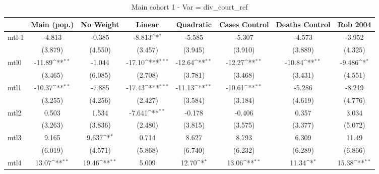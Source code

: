 \documentclass{article}
\begin{document}
{
\def\sym#1{\ifmmode^{#1}\else\(^{#1}\)\fi}
\begin{longtable}{l*{7}{c}}
\caption{Main cohort 1 - Var = div\_court\_ref}\\
\hline\hline\endfirsthead\hline\endhead\hline\endfoot\endlastfoot
                &\multicolumn{1}{c}{Main (pop.)}&\multicolumn{1}{c}{No Weight}&\multicolumn{1}{c}{Linear}&\multicolumn{1}{c}{Quadratic}&\multicolumn{1}{c}{Cases Control}&\multicolumn{1}{c}{Deaths Control}&\multicolumn{1}{c}{Rob 2004}\\
\hline
mtl-1           &   -4.813         &   -0.385         &   -8.813\sym{*}  &   -5.585         &   -5.307         &   -4.573         &   -3.952         \\
                &  (3.879)         &  (4.550)         &  (3.457)         &  (3.945)         &  (3.910)         &  (3.889)         &  (4.325)         \\
mtl0            &   -11.89\sym{**} &   -1.044         &   -17.10\sym{***}&   -12.64\sym{**} &   -12.27\sym{**} &   -10.84\sym{**} &   -9.486\sym{*}  \\
                &  (3.465)         &  (6.085)         &  (2.708)         &  (3.781)         &  (3.468)         &  (3.431)         &  (4.551)         \\
mtl1            &   -10.37\sym{**} &   -7.885         &   -17.43\sym{***}&   -11.13\sym{**} &   -10.61\sym{**} &   -5.286         &   -8.219         \\
                &  (3.255)         &  (4.256)         &  (2.427)         &  (3.584)         &  (3.184)         &  (4.619)         &  (4.776)         \\
mtl2            &    0.503         &    1.534         &   -7.641\sym{**} &   -0.178         &   -0.406         &    0.357         &    3.034         \\
                &  (3.263)         &  (3.836)         &  (2.480)         &  (3.815)         &  (3.575)         &  (3.377)         &  (5.072)         \\
mtl3            &    9.165         &    9.637\sym{*}  &    0.714         &    8.627         &    8.793         &    6.309         &    11.49         \\
                &  (6.019)         &  (4.571)         &  (5.868)         &  (6.740)         &  (6.232)         &  (6.289)         &  (6.866)         \\
mtl4            &    13.07\sym{**} &    19.46\sym{**} &    5.009         &    12.70\sym{*}  &    13.06\sym{**} &    11.34\sym{*}  &    15.38\sym{**} \\

\end{longtable}}
\end{document}
